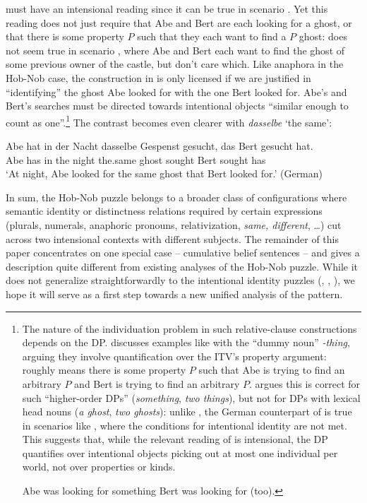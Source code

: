 \documentclass[output=paper]{langscibook}
\begin{document}
\noindent {} must have an intensional reading since it can be true in scenario . Yet this reading does not just require that Abe and Bert are each looking for a ghost, or that there is some property $P$ such that they each want to find a $P$ ghost:  does not seem true in scenario , where Abe and Bert each want to find the ghost of some previous owner of the castle, but don't care which. Like anaphora in the Hob-Nob case, the construction in  is only licensed if we are justified in ``identifying'' the ghost Abe looked for with the one Bert looked for. Abe's and Bert's searches must be directed towards intentional objects ``similar enough to count as one''.\footnote{The nature of the individuation problem in such relative-clause constructions depends on the DP. \citet{Zimmermann:2006} discusses examples like  with the ``dummy noun'' \textit{-thing}, arguing they involve quantification over the ITV's property argument:  roughly means there is some property $P$ such that Abe is trying to find an arbitrary $P$ and Bert is trying to find an arbitrary $P$. \citet{Haslinger:2019} argues this is correct for such ``higher-order DPs'' (\textit{something}, \textit{two things}), but not for DPs with lexical head nouns (\textit{a ghost}, \textit{two ghosts}): unlike , the German counterpart of  is true in scenarios like , where the conditions for intentional identity are not met. This suggests that, while the relevant reading of  is intensional, the DP quantifies over intentional objects picking out at most one individual per world, not over properties or kinds.

\ea \label{sch-has:ex:16} Abe was looking for something Bert was looking for (too). \z


} The contrast becomes even clearer with \textit{dasselbe} `the same':

\ea \label{sch-has:ex:18} {\gll Abe hat in der Nacht dasselbe Gespenst gesucht, das Bert gesucht hat. \\
Abe has in the night the.same ghost sought \REL{} Bert sought has \\
\glt `At night, Abe looked for the same ghost that Bert looked for.'} \hfill (German) \z

\noindent In sum, the Hob-Nob puzzle belongs to a broader class of configurations where semantic identity or distinctness relations required by certain expressions (plurals, numerals, anaphoric pronouns, relativization, \textit{same, different}, \ldots) cut across two intensional contexts with different subjects. The remainder of this paper concentrates on one special case -- cumulative belief sentences -- and gives a description quite different from existing analyses of the Hob-Nob puzzle. While it does not generalize straightforwardly to the intentional identity puzzles (, , ), we hope it will serve as a first step towards a new unified analysis of the pattern.
\end{document}

